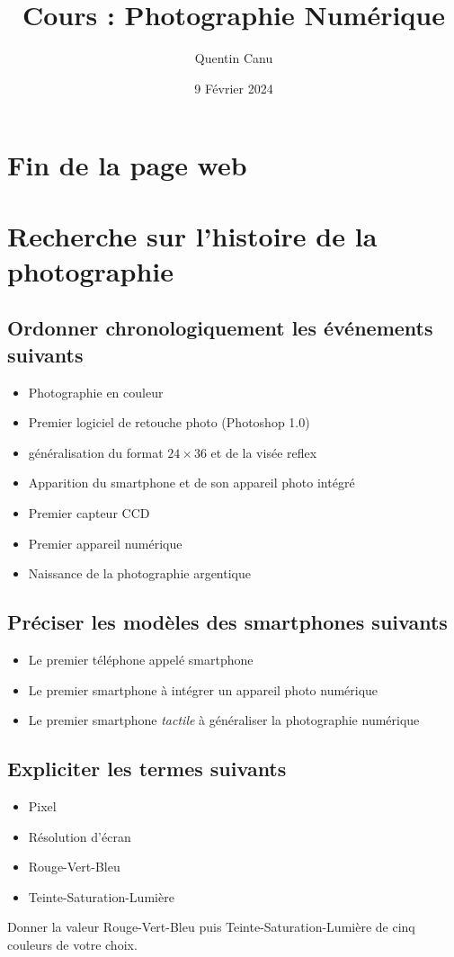 \documentclass{article}
\title{Cours : Photographie Numérique}
\date{9 Février 2024}
\author{Quentin Canu}
\begin{document}
\maketitle

\section{Fin de la page web}
\section{Recherche sur l'histoire de la photographie}
\subsection{Ordonner chronologiquement les événements suivants}
\begin{itemize}
\item Photographie en couleur
\item Premier logiciel de retouche photo (Photoshop 1.0)
\item généralisation du format $24 \times 36$ et de la visée reflex
\item Apparition du smartphone et de son appareil photo intégré
\item Premier capteur CCD
\item Premier appareil numérique
\item Naissance de la photographie argentique
\end{itemize}
\subsection{Préciser les modèles des smartphones suivants}
\begin{itemize}
\item Le premier téléphone appelé \og smartphone \fg
\item Le premier smartphone à intégrer un appareil photo numérique
\item Le premier smartphone \emph{tactile} à généraliser la photographie numérique  
\end{itemize}
\subsection{Expliciter les termes suivants}
\begin{itemize}
\item Pixel
\item Résolution d'écran
\item Rouge-Vert-Bleu
\item Teinte-Saturation-Lumière
\end{itemize}
Donner la valeur Rouge-Vert-Bleu puis Teinte-Saturation-Lumière de cinq couleurs de votre choix.
\end{document}
